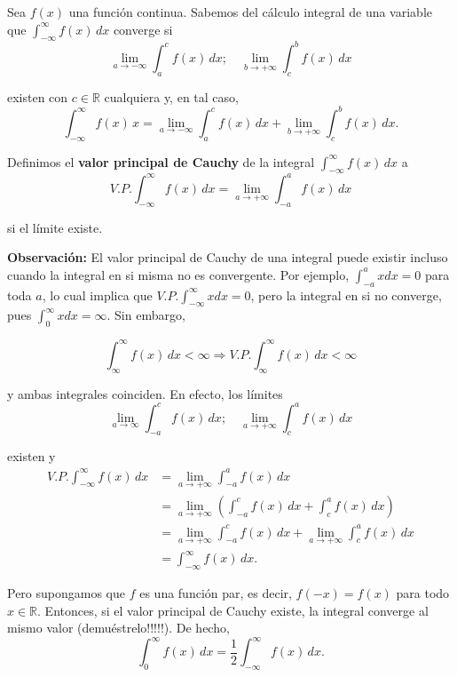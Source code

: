 Sea $f(x)$ una función continua. Sabemos del cálculo integral de una variable que $\int_{-\infty}^{\infty} f(x)\,dx$ converge si
$$\lim_{a \to - \infty} \int_{a}^{c}f(x) \,dx; \quad \lim_{b \to + \infty} \int_{c}^{b}f(x) \,dx$$

existen con $c \in \mathbb{R}$ cualquiera y, en tal caso,
$$\int_{-\infty}^{\infty} f(x) \,x = \lim_{a \to - \infty} \int_{a}^{c}f(x) \,dx +  \lim_{b \to + \infty} \int_{c}^{b}f(x) \,dx .$$

\begin{defi}
Definimos el \textbf{valor principal de Cauchy} de la integral $\int_{-\infty}^{\infty} f(x)\,dx$ a
$$V.P. \int_{- \infty}^{\infty} f(x) \,dx = \lim_{a\to + \infty} \int_{-a}^a f(x)\,dx$$

si el límite existe.
\end{defi}

\textbf{Observación:} El valor principal de Cauchy de una integral puede existir incluso cuando la integral en si misma no es convergente. Por ejemplo, $\int_{-a}^ax dx = 0$ para toda $a$, lo cual implica que $V.P. \int_{-\infty}^{\infty} xdx = 0$, pero la integral en si no converge, pues $\int_0^{\infty} xdx = \infty$. Sin embargo, 
\begin{shaded}
$$\int_{\infty}^{\infty} f(x) \,dx < \infty \Rightarrow V.P. \int_{\infty}^{\infty} f(x) \,dx < \infty$$
\end{shaded}

y ambas integrales coinciden. En efecto, los límites
$$\lim_{a \to \infty} \int_{-a}^{c}f(x) \,dx; \quad \lim_{a \to + \infty} \int_{c}^{a}f(x) \,dx$$

existen y
\begin{align*}
   V.P. \int_{- \infty}^{\infty} f(x) \,dx &= \lim_{a\to + \infty} \int_{-a}^a f(x)\,dx  \\
   &= \lim_{a\to + \infty} \left(\int_{-a}^{c} f(x) \,dx + \int_c^a f(x) \,dx \right) \\
   &= \lim_{a\to + \infty} \int_{-a}^{c} f(x) \,dx +  \lim_{a\to + \infty}\int_c^a f(x) \,dx \\
   &= \int_{- \infty}^{\infty} f(x) \,dx.
\end{align*} 

Pero supongamos que $f$ es una función par, es decir, $f(-x) = f(x)$ para todo $x \in \mathbb{R}$. Entonces, si el valor principal de Cauchy existe, la integral converge al mismo valor (demuéstrelo!!!!!). De hecho,
\begin{equation}
 \int_0^{\infty} f(x) \,dx = \frac{1}{2} \int_{-\infty}^{\infty} f(x) \,dx. \label{IntIPar}   
\end{equation}

